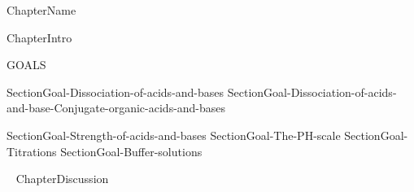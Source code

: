 \documentclass[main.tex]{subfiles}
\begin{document}
  {ChapterName}
       \begin{marginfigure}
\end{marginfigure}
   
  {ChapterIntro}
\begin{marginfigure}%
\begin{mytcbox}{GOALS}
\begin{enumerate}[label=\protect\circled{\color{white}\arabic*}]

{SectionGoal-Dissociation-of-acids-and-bases}
{SectionGoal-Dissociation-of-acids-and-base-Conjugate-organic-acids-and-bases}

{SectionGoal-Strength-of-acids-and-bases}
{SectionGoal-The-PH-scale}
{SectionGoal-Titrations}
{SectionGoal-Buffer-solutions}

\end{enumerate}
\end{mytcbox}
\vspace{1cm}
\begin{tcolorbox}[enhanced,colback=red!5!white,colframe=black!50!red,boxrule=1pt,
  arc=0pt,outer arc=0pt,drop heavy lifted shadow]
\faGears\ 
   {ChapterDiscussion}
\end{tcolorbox}
\end{marginfigure}%
\end{document}
